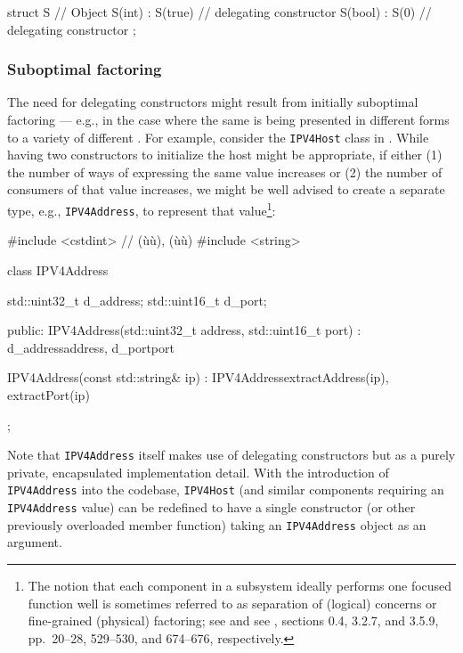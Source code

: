 \begin{emcppslisting}[language=C++]
struct S  // Object
{
    S(int)  : S(true) { }  // delegating constructor
    S(bool) : S(0)    { }  // delegating constructor
};
\end{emcppslisting}

\subsubsection[Suboptimal factoring]{Suboptimal factoring}\label{suboptimal-factoring}

The need for delegating constructors might result from initially
suboptimal factoring --- e.g., in the case where the same 
is being presented in different forms to a variety of different
. For example, consider the \lstinline!IPV4Host! class
in . %
While having two constructors to
initialize the host might be appropriate, if either (1) the number of
ways of expressing the same value increases or (2) the number of
consumers of that value increases, we might be well advised to create a
separate  type, e.g., \lstinline!IPV4Address!, to
represent that value{\cprotect\footnote{The notion that each component
in a subsystem ideally performs one focused function well is sometimes
referred to as separation of (logical) concerns or
  fine-grained (physical) factoring; see \cite{dijkstra82} and see \cite{lakos20},
  sections 0.4, 3.2.7, and 3.5.9, pp.~20--28, 529--530, and 674--676,
  respectively.}}:

\begin{emcppslisting}[language=C++]
#include <cstdint> // (ù{}ù), (ù{}ù)
#include <string>

class IPV4Address
{
    std::uint32_t d_address;
    std::uint16_t d_port;

public:
    IPV4Address(std::uint32_t address, std::uint16_t port)
        : d_address{address}, d_port{port}
    {
    }

    IPV4Address(const std::string& ip)
        : IPV4Address{extractAddress(ip), extractPort(ip)}
    {
    }
};
\end{emcppslisting}

\noindent Note that \lstinline!IPV4Address! itself makes use of delegating
constructors but as a purely private, encapsulated implementation
detail. With the introduction of \lstinline!IPV4Address! into the codebase,
\lstinline!IPV4Host! (and similar components requiring an
\lstinline!IPV4Address! value) can be redefined to have a single
constructor (or other previously overloaded member function) taking
an \lstinline!IPV4Address! object as an argument.

